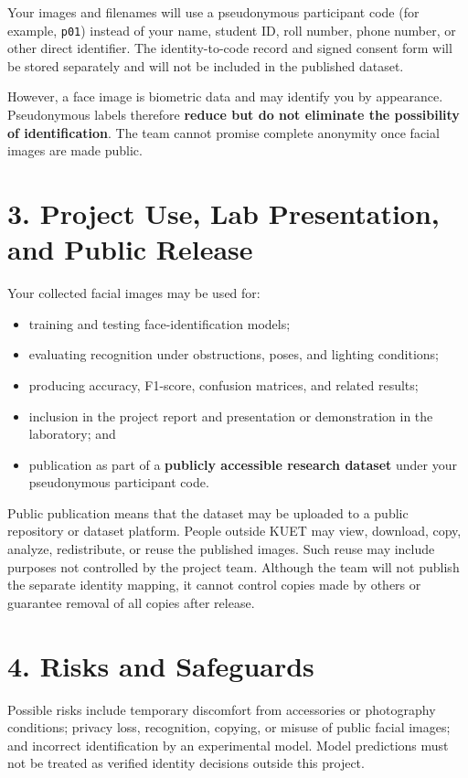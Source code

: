 \documentclass[11pt,a4paper]{article}
\begin{document}
Your images and filenames will use a pseudonymous participant code (for example, \texttt{p01}) instead of your name, student ID, roll number, phone number, or other direct identifier. The identity-to-code record and signed consent form will be stored separately and will not be included in the published dataset.

However, a face image is biometric data and may identify you by appearance. Pseudonymous labels therefore \textbf{reduce but do not eliminate the possibility of identification}. The team cannot promise complete anonymity once facial images are made public.

\section*{3. Project Use, Lab Presentation, and Public Release}

Your collected facial images may be used for:

\begin{itemize}
    \item training and testing face-identification models;
    \item evaluating recognition under obstructions, poses, and lighting conditions;
    \item producing accuracy, F1-score, confusion matrices, and related results;
    \item inclusion in the project report and presentation or demonstration in the laboratory; and
    \item publication as part of a \textbf{publicly accessible research dataset} under your pseudonymous participant code.
\end{itemize}

Public publication means that the dataset may be uploaded to a public repository or dataset platform. People outside KUET may view, download, copy, analyze, redistribute, or reuse the published images. Such reuse may include purposes not controlled by the project team. Although the team will not publish the separate identity mapping, it cannot control copies made by others or guarantee removal of all copies after release.

\section*{4. Risks and Safeguards}

Possible risks include temporary discomfort from accessories or photography conditions; privacy loss, recognition, copying, or misuse of public facial images; and incorrect identification by an experimental model. Model predictions must not be treated as verified identity decisions outside this project.
\end{document}
